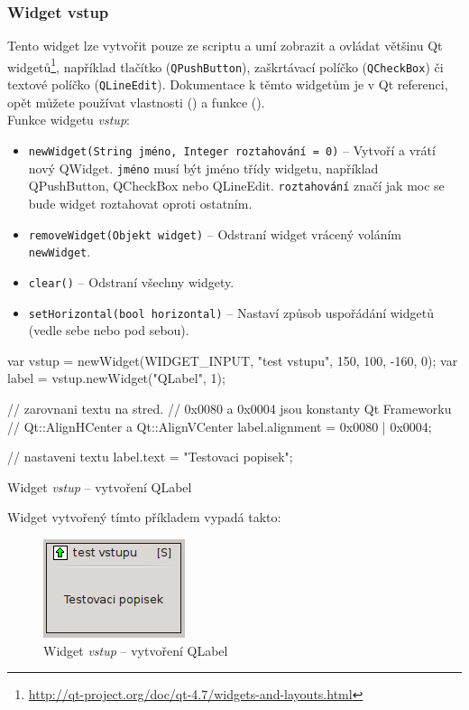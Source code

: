 \documentclass[12pt, a4paper, oneside]{article}
\newcommand{\It}{\textit}  %
\begin{document}
\subsubsection*{Widget vstup}
Tento widget lze vytvořit pouze ze scriptu a umí zobrazit a ovládat většinu Qt widgetů\footnote{\url{http://qt-project.org/doc/qt-4.7/widgets-and-layouts.html}}, například tlačítko (\verb/QPushButton/), zaškrtávací políčko (\verb/QCheckBox/) či textové políčko (\verb/QLineEdit/). Dokumentace k těmto widgetům je v Qt referenci, opět můžete používat vlastnosti () a funkce ().\\
Funkce widgetu \It{vstup}:
\begin{itemize}
    \item {\color{blue}\verb/newWidget(String jméno, Integer roztahování = 0)/} -- Vytvoří a vrátí nový QWidget. \verb/jméno/ musí být jméno třídy widgetu, například QPushButton, QCheckBox nebo QLineEdit. \verb/roztahování/ značí jak moc se bude widget roztahovat oproti ostatním.
    \item {\color{blue}\verb/removeWidget(Objekt widget)/} -- Odstraní widget vrácený voláním \verb|newWidget|.
    \item {\color{blue}\verb/clear()/} -- Odstraní všechny widgety.
    \item {\color{blue}\verb/setHorizontal(bool horizontal)/} -- Nastaví způsob uspořádání widgetů (vedle sebe nebo pod sebou).
\end{itemize}

\begin{listing}[H]
\begin{jscode}
var vstup = newWidget(WIDGET_INPUT,
                "test vstupu", 150, 100, -160, 0);
var label = vstup.newWidget("QLabel", 1);

// zarovnani textu na stred. 
// 0x0080 a 0x0004 jsou konstanty Qt Frameworku 
// Qt::AlignHCenter a Qt::AlignVCenter
label.alignment = 0x0080 | 0x0004;

// nastaveni textu
label.text = "Testovaci popisek";
\end{jscode}
\caption{Widget \It{vstup} -- vytvoření QLabel}
\end{listing}
Widget vytvořený tímto příkladem vypadá takto:

\begin{figure}[H]
\begin{center}
\includegraphics{img/ref_input.png}
\caption{Widget \It{vstup} -- vytvoření QLabel}
\end{center}
\end{figure}
\end{document}
